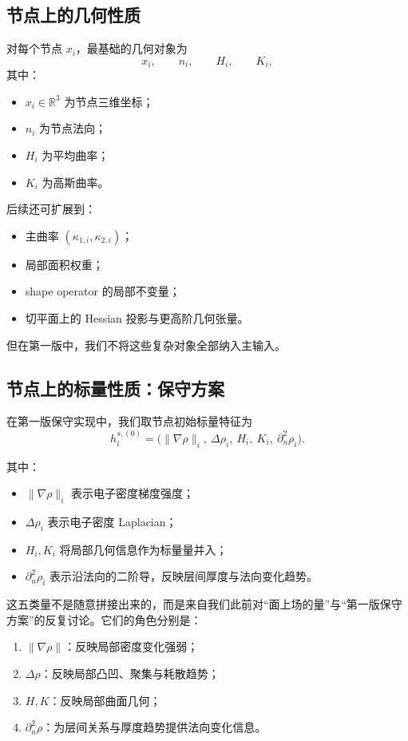 \documentclass[12pt,a4paper]{ctexart}
\begin{document}
\subsection{节点上的几何性质}

对每个节点 \(x_i\)，最基础的几何对象为
\[
x_i,\qquad n_i,\qquad H_i,\qquad K_i,
\]
其中：
\begin{itemize}[leftmargin=2em]
    \item \(x_i\in\mathbb R^3\) 为节点三维坐标；
    \item \(n_i\) 为节点法向；
    \item \(H_i\) 为平均曲率；
    \item \(K_i\) 为高斯曲率。
\end{itemize}

后续还可扩展到：
\begin{itemize}[leftmargin=2em]
    \item 主曲率 \((\kappa_{1,i},\kappa_{2,i})\)；
    \item 局部面积权重；
    \item shape operator 的局部不变量；
    \item 切平面上的 Hessian 投影与更高阶几何张量。
\end{itemize}
但在第一版中，我们不将这些复杂对象全部纳入主输入。

\subsection{节点上的标量性质：保守方案}

在第一版保守实现中，我们取节点初始标量特征为
\[
h_i^{s,(0)}
=
\Big(
\|\nabla\rho\|_i,\
\Delta\rho_i,\
H_i,\
K_i,\
\partial_n^2\rho_i
\Big).
\]

其中：
\begin{itemize}[leftmargin=2em]
    \item \(\|\nabla\rho\|_i\) 表示电子密度梯度强度；
    \item \(\Delta\rho_i\) 表示电子密度 Laplacian；
    \item \(H_i,K_i\) 将局部几何信息作为标量量并入；
    \item \(\partial_n^2\rho_i\) 表示沿法向的二阶导，反映层间厚度与法向变化趋势。
\end{itemize}

这五类量不是随意拼接出来的，而是来自我们此前对“面上场的量”与“第一版保守方案”的反复讨论。它们的角色分别是：

\begin{enumerate}[leftmargin=2em]
    \item \(\|\nabla\rho\|\)：反映局部密度变化强弱；
    \item \(\Delta\rho\)：反映局部凸凹、聚集与耗散趋势；
    \item \(H,K\)：反映局部曲面几何；
    \item \(\partial_n^2\rho\)：为层间关系与厚度趋势提供法向变化信息。
\end{enumerate}
\end{document}
